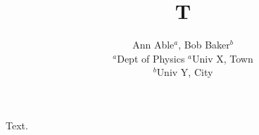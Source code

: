 \documentclass{article}
\begin{document}
\title{T}
\author{Ann Able$^{a}$, Bob Baker$^{b}$ \\ $^a$Dept of Physics $^a$Univ X, Town \\ $^b$Univ Y, City}
\maketitle
Text.
\end{document}
